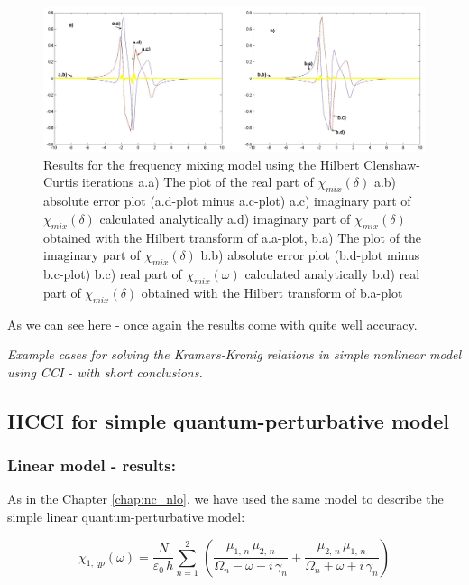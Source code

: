 \documentclass[12pt,twoside,a4paper]{article}
\numberwithin{equation}{subsection}
\numberwithin{figure}{subsection}
\begin{document}
\begin{figure} 
  \includegraphics[width=150mm]{img/hcc_fmix.png}
  \caption{Results for the frequency mixing model using the Hilbert Clenshaw-Curtis iterations
     a.a) The plot of the real part of ${\chi_{mix}}(\delta )$
     a.b) absolute error plot (a.d-plot minus a.c-plot) 
     a.c) imaginary part of ${\chi_{mix}}(\delta )$ calculated analytically 
     a.d) imaginary part of ${\chi_{mix}}(\delta )$ obtained with the Hilbert transform of a.a-plot, 
     b.a) The plot of the imaginary part of ${\chi_{mix}}(\delta )$ 
     b.b) absolute error plot (b.d-plot minus b.c-plot) 
     b.c) real part of $\chi_{mix} (\omega )$ calculated analytically 
     b.d) real part of ${\chi_{mix}}(\delta )$ obtained with the Hilbert transform of b.a-plot 
     \label{fig:hcci_fmix}
     }
\end{figure}

As we can see here - once again the results come with quite well accuracy.

\textit{Example cases for solving the Kramers-Kronig relations in simple nonlinear model using CCI - with short conclusions.}


\subsection{HCCI for simple quantum-perturbative model} \label{chap:hcc_quantum}
 
\subsubsection*{Linear model - results:}

As in the Chapter \ref{chap:nc_nlo}, we have used the same model to describe the simple linear quantum-perturbative model: 

\begin{equation} \label{eq:hcc_qp}
  {\chi_{1, \,qp}}(\omega ) = \frac {N}{\varepsilon_0\,h} \sum_{n=1}^{2}\,(\frac {{\mu_{1, \,n}}\,{ \mu_{2, \,n}}}{{\Omega_{n}}
  - \omega  - i\,{\gamma_{n}}} + \frac {{\mu_{2, \,n}}\,{\mu_{1, \,n}}}{{\Omega_{n}} + \omega + i\,{\gamma_{n}}})
\end{equation}
\end{document}
